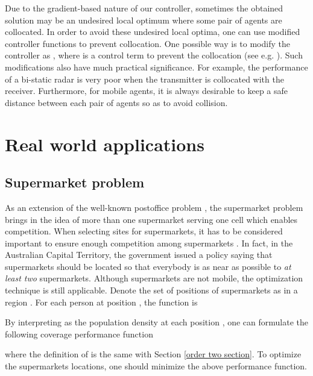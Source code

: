 \documentclass[letterpaper, 10 pt, conference]{ieeeconf}
\begin{document}
Due to the gradient-based nature of our controller, sometimes the obtained solution may be an undesired local optimum where some pair of agents are collocated. In order to avoid these undesired local optima, one can use modified controller functions to prevent collocation. One possible way is to modify the controller as , where  is a control term to prevent the collocation (see e.g. \cite{hussein2007effective}).
Such modifications also have much practical significance. For example, the performance of a bi-static radar is very poor when the transmitter is collocated with the receiver. Furthermore, for mobile agents, it is always desirable to keep a safe distance between each pair of agents so as to avoid collision.

\section{Real world applications}
\label{Real world applications}
\subsection{Supermarket problem}
\label{supermarket problem definition}
As an extension of the well-known postoffice problem \cite{clarkson1985probabilistic}, the supermarket problem brings in the idea of more than one supermarket serving one cell which enables competition. When selecting sites for supermarkets, it has to be considered important to ensure enough competition among supermarkets \cite{martin2009review}. In fact, in the Australian Capital Territory, the government issued  a policy saying that supermarkets should be located so that everybody is as near as possible to \textit{at least two} supermarkets.
Although supermarkets are not mobile, the optimization technique is still applicable.
Denote the set of positions of supermarkets as  in a region . For each person at position , the  function is

By interpreting  as  the population density at each position , one can formulate the following coverage performance function

where the definition of  is the same with Section \ref{order two section}.
To optimize the supermarkets locations, one should minimize the above performance function.
\end{document}
